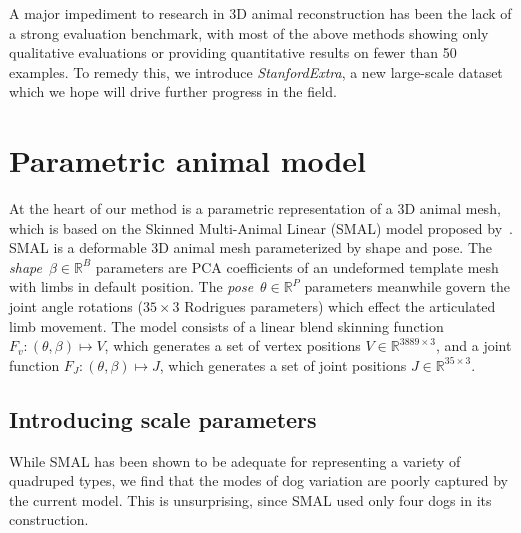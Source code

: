 A major impediment to research in 3D animal reconstruction has been the lack of a strong evaluation benchmark, with most of the above methods showing only qualitative evaluations or providing quantitative results on fewer than 50 examples. To remedy this, we introduce \emph{StanfordExtra}, a new large-scale dataset which we hope will drive further progress in the field. 



\section{Parametric animal model}

\def\R#1{{\mathbb{R}^{#1}}}
\def\RR#1#2{{\mathbb{R}^{#1 \times #2}}}
\def\posn{\phi}
\def\pose{\theta}
\def\npose{P}
\def\shape{\beta}
\def\scale{\kappa}
\def\trans{t}
\def\betacov{{\Sigma_{\beta}}}
\def\posecov{{\Sigma_{\pose}}}
\def\posemean{{\mu_{\pose}}}
\def\betamean{{\mu_{\beta}}}
\def\nimages{N}
\def\nshape{B}
\def\verts{\nu}
\def\nverts{V}
\def\jointselect{\mathtt{K}}
\def\njoints{J}
\def\f{f}

At the heart of our method is a parametric representation of a 3D animal mesh, which is based on the Skinned Multi-Animal Linear (SMAL) model proposed by~\cite{zuffi2017menagerie}. SMAL is a deformable 3D animal mesh parameterized by shape and pose. The \emph{shape}~$\shape \in \R\nshape$ parameters are PCA coefficients of an undeformed template mesh with limbs in default position. The \emph{pose}~$\pose \in \R\npose$ parameters meanwhile govern the joint angle rotations ($35 \times 3$ Rodrigues parameters) which effect the articulated limb movement. The model consists of a linear blend skinning function $F_{v}: (\pose, \shape) \mapsto V$, which generates a set of vertex positions $V \in \RR{3889}{3}$, and a joint function $F_{J}: (\pose, \shape) \mapsto J$, which generates a set of joint positions $J \in \RR{35}{3}$.

\subsection{Introducing scale parameters}
While SMAL has been shown to be adequate for representing a variety of quadruped types, we find that the modes of dog variation are poorly captured by the current model. This is unsurprising, since SMAL used only four dogs in its construction.

